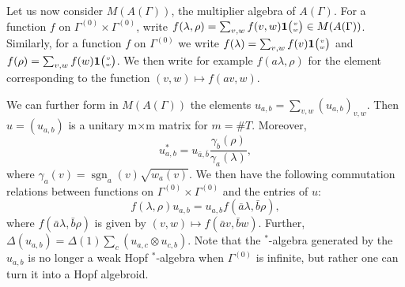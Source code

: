 \documentclass[10pt]{article}
\DeclareMathOperator{\sgn}{\mathrm{sgn}}
\newcommand{\Grt}[3]{#1{\tiny {\begin{pmatrix} #2\\#3\end{pmatrix}}}}
\newcommand{\UnitC}[2]{\Grt{\mathbf{1}}{#1}{#2}}
\theoremstyle{definition}
\numberwithin{equation}{section}
\begin{document}
Let us now consider $M(A(\Gamma))$, the multiplier algebra of $A(\Gamma)$. For a function $f$ on $\Gamma^{(0)}\times \Gamma^{(0)}$, write $f(\lambda,\rho) = \sum_{v,w} f(v,w)\UnitC{v}{w} \in M(A(\Gamma))$. Similarly, for a function $f$ on $\Gamma^{(0)}$ we write $f(\lambda) = \sum_{v,w} f(v)\UnitC{v}{w}$ and $f(\rho) = \sum_{v,w}f(w)\UnitC{v}{w}$. We then write for example $f(a\lambda,\rho)$ for the element corresponding to the function $(v,w)\mapsto f(av,w)$.

We can further form in $M(A(\Gamma))$ the elements $u_{a,b} = \sum_{v,w} (u_{a,b})_{v,w}$. Then $u=(u_{a,b})$ is a unitary m$\times$m matrix for $m=\#T$.  Moreover, \begin{equation}\label{EqAdju}u_{a,b}^* =
  u_{\bar{a},\bar{b}}\frac{\gamma_b(\rho)}{\gamma_a(\lambda)},\end{equation}
where $\gamma_a(v) = \sgn_a(v)\sqrt{w_a(v)}$.   We then have the
following commutation relations between functions on
$\Gamma^{(0)}\times \Gamma^{(0)}$ and the entries of
$u$: \begin{equation}\label{EqGradu} f(\lambda,\rho)u_{a,b} =
  u_{a,b}f(\bar{a}\lambda,\bar{b}\rho),\end{equation} where
$f(\bar{a}\lambda,\bar{b}\rho)$ is given by $(v,w) \mapsto f(\bar{a}v,\bar{b}w)$. Further, $\Delta(u_{a,b}) = \Delta(1) \sum_c(u_{a,c}\otimes u_{c,b})$. Note that the $^*$-algebra generated by the $u_{a,b}$ is no longer a weak Hopf $^*$-algebra when $\Gamma^{(0)}$ is infinite, but rather one can turn it into a Hopf algebroid.
\end{document}
